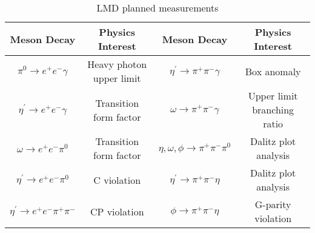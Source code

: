 \begin{table}[h!]
\begin{minipage}{\textwidth}
\begin{center}


\caption{\label{tab:lmd.channels}LMD planned measurements \vspace{0.75mm}}
\begin{tabular}{cc||cc}
\hline
Meson Decay & Physics Interest &Meson Decay & Physics Interest \\
\hline
$\pi^0\to e^+e^-\gamma$  & Heavy photon upper limit &$\eta^{\prime}\to \pi^+\pi^-\gamma$  & Box anomaly \\
$\eta^{\prime}\to e^+e^-\gamma$  & Transition form factor &$\omega\to \pi^+\pi^-\gamma$  & Upper limit branching ratio \\
$\omega\to e^+e^-\pi^0$ & Transition form factor & $\eta, \omega, \phi\to \pi^+\pi^-\pi^0$ & Dalitz plot analysis\\
$\eta^{\prime}\to e^+e^-\pi^0$ & C violation & $\eta^{\prime}\to \pi^+\pi^-\eta$ & Dalitz plot analysis\\
$\eta^{\prime}\to e^+e^-\pi^+\pi^-$  & CP violation & $\phi\to \pi^+\pi^-\eta$ & G-parity violation\\
\hline 
\end{tabular}


\end{center}
\end{minipage}
\end{table}
\vspace{20pt}